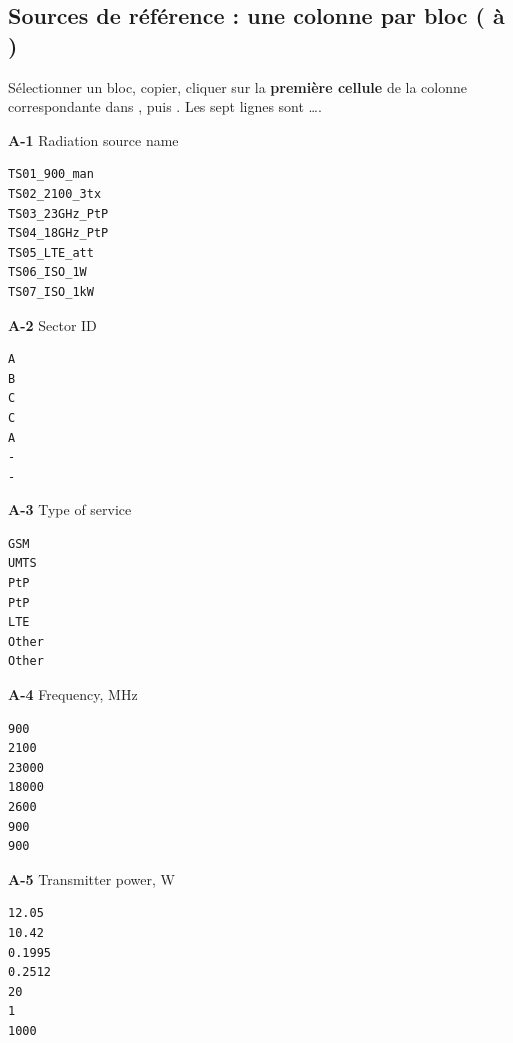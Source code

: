 \subsection{Sources de référence : une colonne par bloc ( à )}\label{sec:blocsA}
Sélectionner un bloc, copier, cliquer sur la \textbf{première cellule} de la colonne correspondante dans , puis . Les sept lignes sont \ldots{}.
\noindent
\begin{minipage}[t]{0.325\textwidth}\small\textbf{A-1} Radiation source name\\[-2pt]
\begin{Verbatim}[frame=single,framesep=1mm,fontsize=\footnotesize,rulecolor=\color{accent}]
TS01_900_man
TS02_2100_3tx
TS03_23GHz_PtP
TS04_18GHz_PtP
TS05_LTE_att
TS06_ISO_1W
TS07_ISO_1kW
\end{Verbatim}
\end{minipage}\hfill
\begin{minipage}[t]{0.325\textwidth}\small\textbf{A-2} Sector ID\\[-2pt]
\begin{Verbatim}[frame=single,framesep=1mm,fontsize=\footnotesize,rulecolor=\color{accent}]
A
B
C
C
A
-
-
\end{Verbatim}
\end{minipage}\hfill
\begin{minipage}[t]{0.325\textwidth}\small\textbf{A-3} Type of service\\[-2pt]
\begin{Verbatim}[frame=single,framesep=1mm,fontsize=\footnotesize,rulecolor=\color{accent}]
GSM
UMTS
PtP
PtP
LTE
Other
Other
\end{Verbatim}
\end{minipage}\hfill
\par\medskip
\noindent
\begin{minipage}[t]{0.325\textwidth}\small\textbf{A-4} Frequency, MHz\\[-2pt]
\begin{Verbatim}[frame=single,framesep=1mm,fontsize=\footnotesize,rulecolor=\color{accent}]
900
2100
23000
18000
2600
900
900
\end{Verbatim}
\end{minipage}\hfill
\begin{minipage}[t]{0.325\textwidth}\small\textbf{A-5} Transmitter power, W\\[-2pt]
\begin{Verbatim}[frame=single,framesep=1mm,fontsize=\footnotesize,rulecolor=\color{accent}]
12.05
10.42
0.1995
0.2512
20
1
1000
\end{Verbatim}
\end{minipage}\hfill
